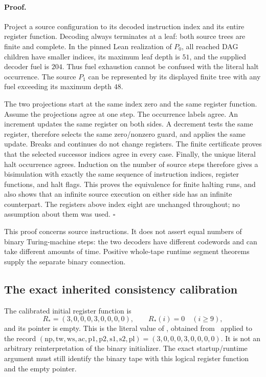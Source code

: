 \paragraph{Proof.}
Project a source configuration to its decoded instruction index
and its entire register function.  Decoding always terminates
at a leaf: both source trees are finite and complete.  In the
pinned Lean realization of $P_0$, all reached DAG children have
smaller indices, its maximum leaf depth is $51$, and the supplied
decoder fuel is $204$.  Thus fuel exhaustion cannot be confused
with the literal halt occurrence.  The source $P_1$ can be
represented by its displayed finite tree with any fuel exceeding
its maximum depth $48$.

The two projections start at the same index zero and the same
register function.  Assume the projections agree at one step.
The occurrence labels agree.  An increment updates the same
register on both sides.  A decrement tests the same register,
therefore selects the same zero/nonzero guard, and applies the
same update.  Breaks and continues do not change registers.
The finite certificate proves that the selected successor
indices agree in every case.  Finally, the unique literal halt
occurrence agrees.  Induction on the number of source steps
therefore gives a bisimulation with exactly the same sequence
of instruction indices, register functions, and halt flags.
This proves the equivalence for finite halting runs, and also
shows that an infinite source execution on either side has an
infinite counterpart.  The registers above index eight are
unchanged throughout; no assumption about them was used.
\hfill$\square$

This proof concerns source instructions.  It does not assert
equal numbers of binary Turing-machine steps: the two decoders
have different codewords and can take different amounts of
time.  Positive whole-tape runtime segment theorems supply the
separate binary connection.

\subsection{The exact inherited consistency calibration}

The calibrated initial register function is
\[
 R_*=(3,0,0,0,3,0,0,0,0),\qquad R_*(i)=0\quad(i\geq9),
\]
and its pointer is empty.  This is the literal value of
, obtained from
\ applied to the record
$(\mathrm{np},\mathrm{tw},\mathrm{ws},\mathrm{ac},
\mathrm{p1},\mathrm{p2},\mathrm{s1},\mathrm{s2},\mathrm{pl})
=(3,0,0,0,3,0,0,0,0)$.
It is not an arbitrary reinterpretation of the binary initializer.
The exact startup/runtime argument must still identify the binary
tape with this logical register function and the empty pointer.

